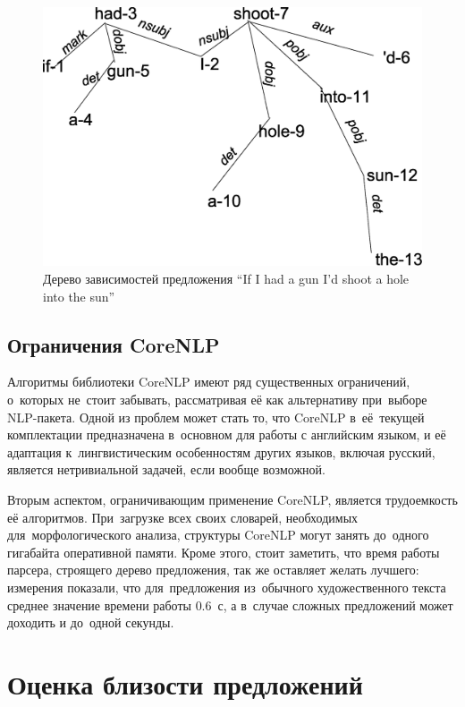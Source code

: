 \begin{figure}
\begin{center}
\includegraphics[scale=0.4]{eps/dependency_tree.eps}
\caption{Дерево зависимостей предложения ``If I had a gun I'd shoot a hole into the sun''}
\label{fig:dependency_tree}
\end{center}
\end{figure}

\subsection{Ограничения CoreNLP}

Алгоритмы библиотеки CoreNLP имеют ряд существенных ограничений, о~которых не~стоит забывать, 
рассматривая её как альтернативу при~выборе NLP-пакета.
Одной из проблем может стать то, что CoreNLP в~её~текущей комплектации
предназначена в~основном для работы с английским языком, 
и её адаптация к~лингвистическим особенностям других языков, включая русский,
является нетривиальной задачей, если вообще возможной.

Вторым аспектом, ограничивающим применение CoreNLP, является трудоемкость её алгоритмов. 
При~загрузке всех своих словарей, необходимых для~морфологического анализа, 
структуры CoreNLP могут занять до~одного гигабайта оперативной памяти.
Кроме этого, стоит заметить, что время работы парсера, строящего дерево предложения,
так же оставляет желать лучшего: измерения показали, что для~предложения
из~обычного художественного текста среднее значение времени работы $0.6$~с,
а в~случае сложных предложений может доходить и до~одной секунды.

\section{Оценка близости предложений}


